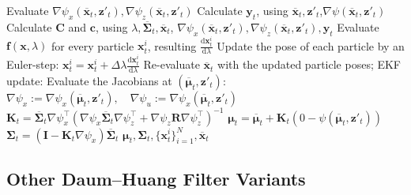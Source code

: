 \begin{algorithm}
\begin{algorithmic}[1]
        \State Evaluate $\nabla\psi_x(\overline{\mathbf{x}}_t,\mathbf{z}'_t),\nabla\psi_z(\overline{\mathbf{x}}_t,\mathbf{z}'_t)$ \Comment{\eqref{eq:measmodel-jacobi-x}-\eqref{eq:measmodel-jacobi-z}}
        \State Calculate $\mathbf{y}_t$, using $\overline{\mathbf{x}}_t,\mathbf{z}'_t$,$\nabla\psi(\overline{\mathbf{x}}_t,\mathbf{z}'_t)$  \Comment{\eqref{eq:edh-implicit-y},\eqref{eq:observation-function}}
        \State Calculate $\mathbf{C}$ and $\mathbf{c}$, using
        $\lambda,\overline{\boldsymbol\Sigma}_t, \overline{\mathbf{x}}_t$,
        $\nabla\psi_x(\overline{\mathbf{x}}_t,\mathbf{z}'_t),\nabla\psi_z(\overline{\mathbf{x}}_t,\mathbf{z}'_t), \mathbf{y}_t$
        \Comment{\eqref{eq:edh-C-impl}-\eqref{eq:edh-c-impl}}
        \State Evaluate $\mathbf{f}(\mathbf{x},\lambda)$ for every particle $\mathbf{x}_t^{i}$, resulting $\frac{\mathrm{d}\mathbf{x}_t^i}{\mathrm{d}\lambda}$
        \Comment{\eqref{eq:edh-flow-vector}}
        \State Update the pose of each particle by an Euler-step:
        \State\indent $\mathbf{x}_t^{i} = \mathbf{x}_t^{i} + \Delta\lambda\frac{\mathrm{d}\mathbf{x}_t^i}{\mathrm{d}\lambda}$
        \State Re-evaluate $\overline{\mathbf{x}}_t$ with the updated particle poses;
        \EndFor
        \State EKF update:
        \State\indent Evaluate the Jacobians at $(\overline{\boldsymbol{\mu}}_t,\mathbf{z}'_t)$:
        \Comment{\eqref{eq:motmodel-jacobi-x}-\eqref{eq:motmodel-jacobi-u}}
        \State\indent\indent $\nabla\psi_x := \nabla\psi_x(\overline{\boldsymbol{\mu}}_t,\mathbf{z}'_t), \quad \nabla\psi_u := \nabla\psi_x(\overline{\boldsymbol{\mu}}_t,\mathbf{z}'_t)$
        \State\indent $\mathbf{K}_t = \overline{\mathbf{\Sigma}}_t\nabla \psi_x^\top\left(\nabla \psi_x\overline{\mathbf{\Sigma}}_t\nabla \psi_z^\top+
            \nabla \psi_z\mathbf{R}\nabla \psi^{\top}_z\right)^{-1}$
        \State\indent $\boldsymbol{\mu}_t = \overline{\boldsymbol{\mu}}_t + \mathbf{K}_t\left(0-\psi(\overline{\boldsymbol{\mu}}_t,\mathbf{z}'_t)\right)$
        \Comment{\eqref{eq:observation-function}}
        \State\indent $\mathbf{\Sigma}_t = \left(\mathbf{I}-\mathbf{K}_t\nabla \psi_x\right)\overline{\mathbf{\Sigma}}_t$
        \State\Return $\boldsymbol{\mu}_t,\boldsymbol{\Sigma}_t,\{\mathbf{x}_t^i\}_{i=1}^{N},\overline{\mathbf{x}}_t$
    \end{algorithmic}
\end{algorithm}
\subsection{Other Daum--Huang Filter Variants}

